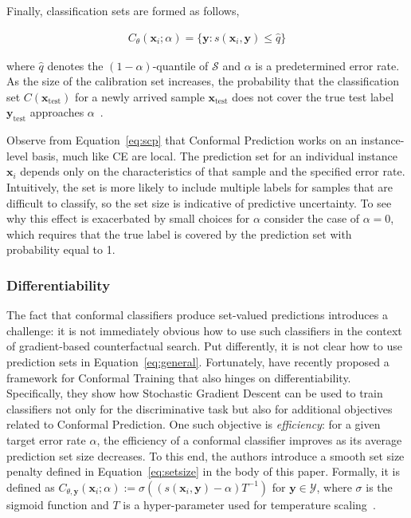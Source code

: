 Finally, classification sets are formed as follows,

\begin{equation}\label{eq:scp}
  \begin{aligned}
    C_{\theta}(\mathbf{x}_i;\alpha)=\{\mathbf{y}: s(\mathbf{x}_i,\mathbf{y}) \le \hat{q}\}
  \end{aligned}
\end{equation}

where $\hat{q}$ denotes the $(1-\alpha)$-quantile of $\mathcal{S}$ and $\alpha$ is a predetermined error rate. As the size of the calibration set increases, the probability that the classification set $C(\mathbf{x}_{\text{test}})$ for a newly arrived sample $\mathbf{x}_{\text{test}}$ does not cover the true test label $\mathbf{y}_{\text{test}}$ approaches $\alpha$~\citep{angelopoulos2021gentle}. 

Observe from Equation~\ref{eq:scp} that Conformal Prediction works on an instance-level basis, much like CE are local. The prediction set for an individual instance $\mathbf{x}_i$ depends only on the characteristics of that sample and the specified error rate. Intuitively, the set is more likely to include multiple labels for samples that are difficult to classify, so the set size is indicative of predictive uncertainty. To see why this effect is exacerbated by small choices for $\alpha$ consider the case of $\alpha=0$, which requires that the true label is covered by the prediction set with probability equal to 1.

\subsubsection{Differentiability}\label{app:cp-diff}

The fact that conformal classifiers produce set-valued predictions introduces a challenge: it is not immediately obvious how to use such classifiers in the context of gradient-based counterfactual search. Put differently, it is not clear how to use prediction sets in Equation~\ref{eq:general}. Fortunately, \citet{stutz2022learning} have recently proposed a framework for Conformal Training that also hinges on differentiability. Specifically, they show how Stochastic Gradient Descent can be used to train classifiers not only for the discriminative task but also for additional objectives related to Conformal Prediction. One such objective is \textit{efficiency}: for a given target error rate $\alpha$, the efficiency of a conformal classifier improves as its average prediction set size decreases. To this end, the authors introduce a smooth set size penalty defined in Equation~\ref{eq:setsize} in the body of this paper. Formally, it is defined as $C_{\theta,\mathbf{y}}(\mathbf{x}_i;\alpha):=\sigma\left((s(\mathbf{x}_i,\mathbf{y})-\alpha) T^{-1}\right)$ for $\mathbf{y}\in\mathcal{Y}$, where $\sigma$ is the sigmoid function and $T$ is a hyper-parameter used for temperature scaling~\citep{stutz2022learning}.


